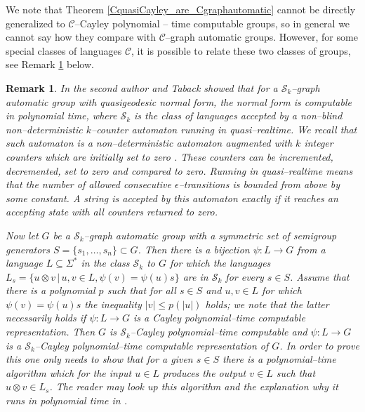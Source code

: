 \documentclass[article,12pt]{elsarticle}
\newtheorem{remark}{Remark}
\begin{document}
   
	We note that Theorem 
	\ref{CquasiCayley_are_Cgraphautomatic} 
	cannot be directly generalized to  
	$\mathcal{C}$--Cayley polynomial -- time 
	computable groups, so in 
	general we cannot say how they compare with  
	$\mathcal{C}$--graph automatic 
	groups. 
	However, for some special classes of languages 
	$\mathcal{C}$, it is possible to relate 
	 these two classes  
	of groups, see Remark \ref{Sk-graph_automatic_remark} 
	below.   
	

	
	\begin{remark}
		\label{Sk-graph_automatic_remark}
	In \cite[Theorem~10]{ElderTabackCgraph} the second 
	author and Taback showed that 
	for a $\mathscr{S}_k$--graph automatic group with 
    quasigeodesic normal form, 
	the normal form is computable in polynomial time, 
	where $\mathscr{S}_k$ is the class of languages 
	accepted by a non--blind non--deterministic 
	$k$--counter automaton running in quasi--realtime.  
	We recall that such automaton is 
	a non--deterministic automaton augmented with 
	$k$ integer counters which are initially set to zero 
	\cite{BookGinsburg72}. 
	These counters can be incremented, decremented, set to 
	zero and compared to zero. Running in quasi--realtime 
	means that the number of allowed  
	consecutive $\epsilon$--transitions is bounded from
	above by some constant.
	A string is accepted by this automaton exactly if it reaches an accepting state with all counters returned to zero.      
	
	
	Now let $G$ be a $\mathscr{S}_k$--graph automatic 
	group with a symmetric set of semigroup generators 
	$S = \{s_1, \dots, s_n \} \subset G$. 
	Then there is a bijection 
	$\psi : L \rightarrow G$ from a language 
	$L \subseteq \Sigma^*$ in the class $\mathscr{S}_k$ 
	to $G$ for which 
	the languages $L_s = \{u \otimes v \,|\, 
	u,v \in L,  \psi (v) = \psi(u) s \}$  
	are in $\mathscr{S}_k$ for every $s \in S$. 
	Assume that there is a polynomial 
	$p$ such that for all $s \in S$ and $u,v \in L$
	for which $\psi(v) = \psi(u)s$ the inequality 
	$|v| \leqslant p (|u|)$ holds; we note that 
	the latter necessarily holds if %
	$\psi : L \rightarrow G$ is a Cayley polynomial--time 
	computable representation.
	Then $G$ is $\mathscr{S}_k$--Cayley polynomial--time computable and $\psi : L \rightarrow G$  
	is a $\mathscr{S}_k$--Cayley polynomial--time computable 
	representation of $G$. 
	In order to prove this
	one only needs to show that for a given 
	$s \in S$ there is a polynomial--time 
	algorithm which for the input $u \in L$
	produces the output $v \in L$ such that  
	$u \otimes v \in L_s$. 
	The reader may look up this algorithm 
	and the explanation why it runs in 
	polynomial time in \cite[Theorem~10]{ElderTabackCgraph}.
\end{remark}	
   
\end{document}
